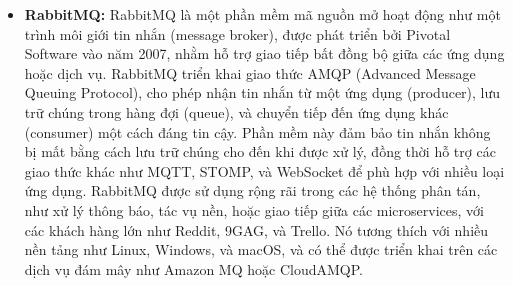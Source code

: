 \begin{itemize}
    \item \textbf{RabbitMQ:} RabbitMQ là một phần mềm mã nguồn mở hoạt động như một trình môi giới tin nhắn (message broker), được phát triển bởi Pivotal Software vào năm 2007, nhằm hỗ trợ giao tiếp bất đồng bộ giữa các ứng dụng hoặc dịch vụ. RabbitMQ triển khai giao thức AMQP (Advanced Message Queuing Protocol), cho phép nhận tin nhắn từ một ứng dụng (producer), lưu trữ chúng trong hàng đợi (queue), và chuyển tiếp đến ứng dụng khác (consumer) một cách đáng tin cậy. Phần mềm này đảm bảo tin nhắn không bị mất bằng cách lưu trữ chúng cho đến khi được xử lý, đồng thời hỗ trợ các giao thức khác như MQTT, STOMP, và WebSocket để phù hợp với nhiều loại ứng dụng. RabbitMQ được sử dụng rộng rãi trong các hệ thống phân tán, như xử lý thông báo, tác vụ nền, hoặc giao tiếp giữa các microservices, với các khách hàng lớn như Reddit, 9GAG, và Trello. Nó tương thích với nhiều nền tảng như Linux, Windows, và macOS, và có thể được triển khai trên các dịch vụ đám mây như Amazon MQ hoặc CloudAMQP.
\end{itemize}

